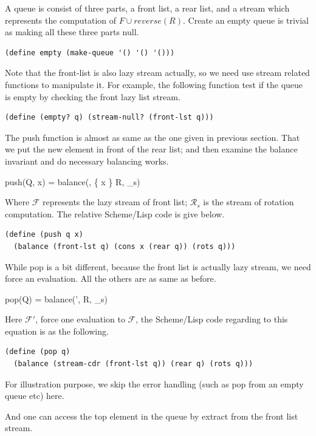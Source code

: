 \documentclass[b5paper]{article}
\begin{document}
A queue is consist of three parts, a front list, a rear list,
and a stream which represents the computation of $F \cup reverse(R)$.
Create an empty queue is trivial as making all these three parts
null.

\begin{lstlisting}
(define empty (make-queue '() '() '()))
\end{lstlisting}

Note that the front-list is also lazy stream actually, so we need use
stream related functions to manipulate it. For example, the following
function test if the queue is empty by checking the front lazy list stream.

\begin{lstlisting}
(define (empty? q) (stream-null? (front-lst q)))
\end{lstlisting}

The push function is almost as same as the one given in previous section.
That we put the new element in front of the rear list; and then examine
the balance invariant and do necessary balancing works.

\be
push(Q, x) = balance(, \{ x \} \cup R, _s)
\ee

Where $\mathcal{F}$ represents the lazy stream of front list; $\mathcal{R}_s$ is
the stream of rotation computation. The relative Scheme/Lisp
code is give below.

\begin{lstlisting}
(define (push q x)
  (balance (front-lst q) (cons x (rear q)) (rots q)))
\end{lstlisting}

While pop is a bit different, because the front list is actually lazy stream,
we need force an evaluation. All the others are as same as before.

\be
pop(Q) = balance(', R, _s)
\ee

Here $\mathcal{F}'$, force one evaluation to $\mathcal{F}$, the Scheme/Lisp
code regarding to this equation is as the following.

\begin{lstlisting}
(define (pop q)
  (balance (stream-cdr (front-lst q)) (rear q) (rots q)))
\end{lstlisting}

For illustration purpose, we skip the error handling (such as pop from
an empty queue etc) here.

And one can access the top element in the queue by extract from
the front list stream.
\end{document}
